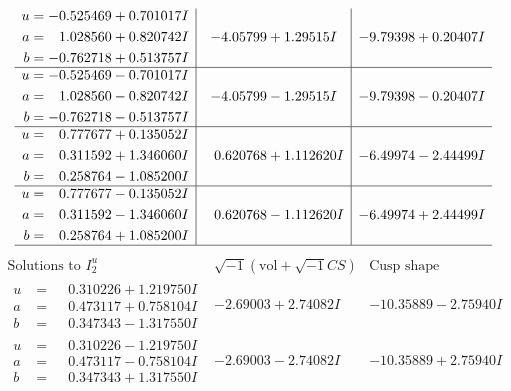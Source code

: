 \documentclass[1p]{elsarticle_modified}
\theoremstyle{definition}
\newcommand{\I}{\sqrt{-1}}
\begin{document}
$$\begin{array}{c|c|c}
\begin{aligned}
u &= -0.525469 + 0.701017 I \\
a &= \phantom{-}1.028560 + 0.820742 I \\
b &= -0.762718 + 0.513757 I\end{aligned}
 & -4.05799 + 1.29515 I & -9.79398 + 0.20407 I \\ \hline\begin{aligned}
u &= -0.525469 - 0.701017 I \\
a &= \phantom{-}1.028560 - 0.820742 I \\
b &= -0.762718 - 0.513757 I\end{aligned}
 & -4.05799 - 1.29515 I & -9.79398 - 0.20407 I \\ \hline\begin{aligned}
u &= \phantom{-}0.777677 + 0.135052 I \\
a &= \phantom{-}0.311592 + 1.346060 I \\
b &= \phantom{-}0.258764 - 1.085200 I\end{aligned}
 & \phantom{-}0.620768 + 1.112620 I & -6.49974 - 2.44499 I \\ \hline\begin{aligned}
u &= \phantom{-}0.777677 - 0.135052 I \\
a &= \phantom{-}0.311592 - 1.346060 I \\
b &= \phantom{-}0.258764 + 1.085200 I\end{aligned}
 & \phantom{-}0.620768 - 1.112620 I & -6.49974 + 2.44499 I\\
 \hline 
 \end{array}$$\newpage$$\begin{array}{c|c|c}  
\text{Solutions to }I^u_{2}& \I (\text{vol} + \sqrt{-1}CS) & \text{Cusp shape}\\
 \hline 
\begin{aligned}
u &= \phantom{-}0.310226 + 1.219750 I \\
a &= \phantom{-}0.473117 + 0.758104 I \\
b &= \phantom{-}0.347343 - 1.317550 I\end{aligned}
 & -2.69003 + 2.74082 I & -10.35889 - 2.75940 I \\ \hline\begin{aligned}
u &= \phantom{-}0.310226 - 1.219750 I \\
a &= \phantom{-}0.473117 - 0.758104 I \\
b &= \phantom{-}0.347343 + 1.317550 I\end{aligned}
 & -2.69003 - 2.74082 I & -10.35889 + 2.75940 I \\ \hline\begin{aligned}

\end{aligned}
\end{array}$$
\end{document}
